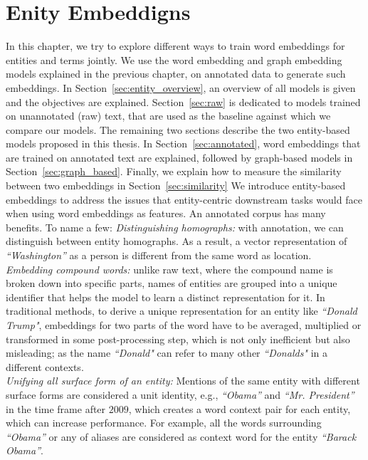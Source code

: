 \chapter{Enity Embeddigns}\label{chap:entity}

In this chapter, we try to explore different ways to train word embeddings for entities and terms jointly. We use the word embedding and graph embedding models explained in the previous chapter, on annotated data to generate such embeddings. In Section~\ref{sec:entity_overview}, an overview of all models is given and the objectives are explained. Section~\ref{sec:raw} is dedicated to models trained on unannotated (raw) text, that are used as the baseline against which we compare our models. The remaining two sections describe the two entity-based models proposed in this thesis. In Section~\ref{sec:annotated},  word embeddings that are trained on annotated text are explained, followed by graph-based models in Section~\ref{sec:graph_based}. Finally, we explain how to measure the similarity between two embeddings in Section~\ref{sec:similarity}
\ornament
We introduce entity-based embeddings to address the issues that entity-centric downstream tasks would face when using word embeddings as features. An annotated corpus has many benefits. To name a few: 
\emph{Distinguishing homographs:} with annotation, we can distinguish between entity homographs. As a result, a vector representation of \emph{``Washington''} as a person is different from the same word as location. \\
\emph{Embedding compound words:}  unlike raw text, where the compound name is broken down into specific parts, names of entities are grouped into a unique identifier that helps the model to learn a distinct representation for it.  In traditional methods, to derive a unique representation for an entity like \emph{``Donald Trump"}, embeddings for two parts of the word have to be averaged, multiplied or transformed in some post-processing step, which is not only inefficient but also misleading; as the name \emph{``Donald"} can refer to many other \emph{``Donalds"} in a different contexts. \\
\emph{Unifying all surface form of an entity:} Mentions of the same entity with different surface forms are considered a unit identity, e.g., \emph{``Obama''} and \emph{``Mr. President''} in the time frame after $2009$, which creates a word context pair for each entity, which can increase performance. For example, all the words surrounding \emph{``Obama''} or any of aliases are considered as context word for the entity \emph{``Barack Obama''}. \\
